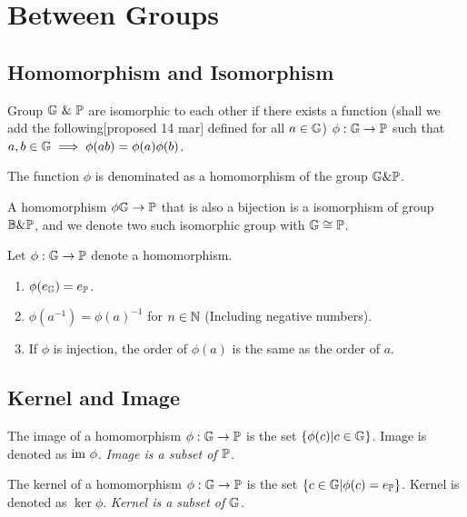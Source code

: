 \documentclass[../note.tex]{subfiles}
\begin{document}
\section{Between Groups}

\subsection{Homomorphism and Isomorphism}

\begin{definition}[Homomorphism]
	Group $\mathbb{G}\ \& \ \mathbb{P}$ are isomorphic to each other if there exists a function (shall we add the following[proposed 14 mar]  defined for all $a \in \mathbb{G}$)
	$\phi: \mathbb{G}\rightarrow \mathbb{P}$ such that	$ a, b \in \mathbb{G} \implies \phi(ab) = \phi(a)\phi(b)$.

	The function $\phi$ is denominated as a homomorphism of the group $\mathbb{G}\&\mathbb{P}$.
\end{definition}

\begin{definition}[Isomorphism]
	A homomorphism $\phi \mathbb{G} \rightarrow \mathbb{P}$ that is also a bijection is a isomorphism of group $\mathbb{B}\&\mathbb{P}$, and we denote two such isomorphic group with $\mathbb{G} \cong \mathbb{P}$.
\end{definition}

\begin{theorem}
	Let $\phi: \mathbb{G} \rightarrow \mathbb{P}$ denote a homomorphism. 
\begin{enumerate}
	\item $\phi(e_{\mathbb{G}}) = e_{\mathbb{P}}$. 
	\item $\phi(a^{-1}) = \phi(a)^{-1}$ for $n\in \mathbb{N}$ (Including negative numbers).
	\item If $\phi$ is injection, the order of $\phi(a)$ is the same as the order of $a$.
\end{enumerate}
\end{theorem}

\subsection{Kernel and Image}
\begin{definition}[Image]
	The image of a homomorphism $\phi: \mathbb{G} \rightarrow \mathbb{P}$ is the set $\{\phi(c) |c \in \mathbb{G}\}$.
	Image is denoted as $\text{im}{\ \phi}$.
	\emph{Image is a subset of $\mathbb{P}$.}
\end{definition}
\begin{definition}[Kernel] 
	The kernel of a homomorphism $\phi: \mathbb{G} \rightarrow \mathbb{P}$ is the set $\{c \in \mathbb{G} | \phi(c) = e_{\mathbb{P}}\}$.
	Kernel is denoted as $\ker{\phi}$.
	\emph{Kernel is a subset of $\mathbb{G}$.}
\end{definition}
\end{document}
